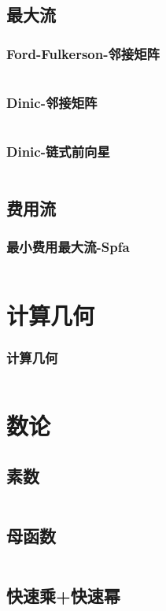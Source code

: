 \documentclass[a4paper,11pt]{article}
\begin{document}
\subsection{最大流}
\subsubsection{Ford-Fulkerson-邻接矩阵}
\inputminted[breaklines]{c++}{图论/Ford-Fulkerson-邻接矩阵.cpp}
\subsubsection{Dinic-邻接矩阵}
\inputminted[breaklines]{c++}{图论/Dinic-邻接矩阵.cpp}
\subsubsection{Dinic-链式前向星}
\inputminted[breaklines]{c++}{图论/Dinic-链式前向星.cpp}
\subsection{费用流}
\subsubsection{最小费用最大流-Spfa}
\inputminted[breaklines]{c++}{图论/最小费用最大流-SPFA.cpp}


\section{计算几何}
\subsubsection{计算几何}
\inputminted[breaklines]{c++}{计算几何/计算几何.cpp}


\section{数论}
\subsection{素数}
\inputminted[breaklines]{c++}{数论/素数-筛法.cpp}
\subsection{母函数}
\inputminted[breaklines]{c++}{数论/母函数.cpp}
\subsection{快速乘+快速幂}
\inputminted[breaklines]{c++}{数论/快速幂+快速乘.cpp}
\end{document}
